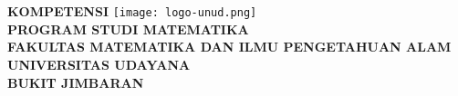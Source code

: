 \chapter*{\centering\normalsize\textbf{\MakeUppercase{\Judul}}}
\begin{center}
    \textbf{KOMPETENSI \MakeUppercase{\Kompetensi}}\vfill
    \texttt{[image: logo-unud.png]}\vfill
    \textbf{\MakeUppercase{\Nama}}\\
    \textbf{\NIM}\vfill
    \textbf{
        PROGRAM STUDI MATEMATIKA\\
        FAKULTAS MATEMATIKA DAN ILMU PENGETAHUAN ALAM\\
        UNIVERSITAS UDAYANA\\
        BUKIT JIMBARAN\\
        \the\year
    }\\\vfill
\end{center}



